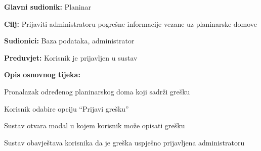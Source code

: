 		\noindent {}
		\begin{packed_item}
			
			\item \textbf{Glavni sudionik: }$ $Planinar$ $
			\item  \textbf{Cilj:} $ $Prijaviti administratoru pogrešne informacije vezane uz planinarske domove$ $
			\item  \textbf{Sudionici:} $ $Baza podataka, administrator $ $
			\item  \textbf{Preduvjet:} $ $Korisnik je prijavljen u sustav $ $
			\item  \textbf{Opis osnovnog tijeka:}
			
			\item[] \begin{packed_enum}
				
				\item $ $Pronalazak određenog planinarskog doma koji sadrži grešku $ $
				\item $ $Korisnik odabire opciju “Prijavi grešku”$ $
				\item $ $Sustav otvara modal u kojem korisnik može opisati grešku 
				\item $ $Sustav obavještava korisnika da je greška uspješno prijavljena administratoru$ $
				
			\end{packed_enum}
		\end{packed_item}
	
